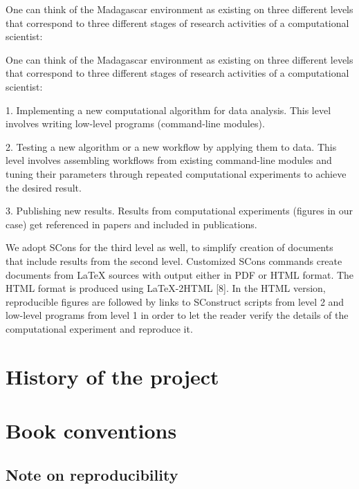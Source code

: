 One can think of the Madagascar environment as existing on three
different levels that correspond to three different stages of research
activities of a computational scientist:

One can think of the Madagascar environment as existing on three
different levels that correspond to three different stages of research
activities of a computational scientist:

1. Implementing a new computational algorithm for data analysis. This
level involves writing low-level programs (command-line modules).

2. Testing a new algorithm or a new workflow by applying them to
data. This level involves assembling workflows from existing
command-line modules and tuning their parameters through repeated
computational experiments to achieve the desired result.

3. Publishing new results. Results from computational experiments
(figures in our case) get referenced in papers and included in
publications.

We adopt SCons for the third level as well, to simplify creation of
documents that include results from the second level. Customized SCons
commands create documents from LaTeX sources with output either in PDF
or HTML format. The HTML format is produced using LaTeX-2HTML [8]. In
the HTML version, reproducible figures are followed by links to
SConstruct scripts from level 2 and low-level programs from level 1 in
order to let the reader verify the details of the computational
experiment and reproduce it.


\section{History of the project}

\section{Book conventions}

\subsection{Note on reproducibility}

